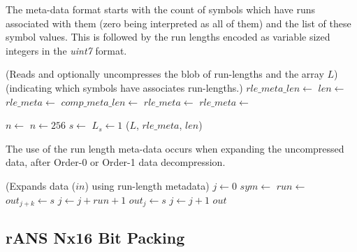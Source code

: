 \documentclass[a4paper]{article}
\begin{document}
The meta-data format starts with the count of symbols which have runs
associated with them (zero being interpreted as all of them) and the
list of these symbol values.  This is followed by the run lengths
encoded as variable sized integers in the \emph{uint7} format.

\begin{algorithmic}[1]
\Statex (Reads and optionally uncompresses the blob of run-lengths and the array $L$)
\Statex (indicating which symbols have associates run-lengths.)
  \State $rle\_meta\_len \gets $
  \State $len \gets $ 
    \State $rle\_meta \gets $
  \Else
    \State $comp\_meta\_len \gets $
    \State $rle\_meta \gets $
    \State $rle\_meta \gets $
    \EndIf

  \Statex
  \State $n \gets$ 
    \State $n \gets 256$
  \EndIf
    \State $s \gets$ 
    \State $L_s \gets 1$
  \EndFor
  \Statex
  \State \Return ($L$, $rle\_meta$, $len$)
\EndFunction
\end{algorithmic}

The use of the run length meta-data occurs when expanding the
uncompressed data, after Order-0 or Order-1 data decompression.

\begin{algorithmic}[1]
\Statex (Expands data ($in$) using run-length metadata)
  \State $j \gets 0$
    \State $sym \gets$ 
      \State $run \gets$ 
          \State $out_{j+k} \gets s$
      \EndFor
      \State $j \gets j + run + 1$
    \Else
      \State $out_j \gets s$
      \State $j \gets j + 1$
    \EndIf
  \EndFor
  \State \Return $out$
\EndFunction
\end{algorithmic}


\subsection{rANS Nx16 Bit Packing}
\label{sec:ranspack}
\end{document}
